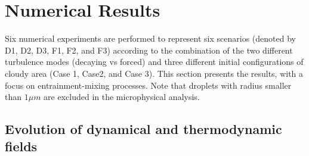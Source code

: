 \documentclass[draft,linenumbers]{agujournal}
\begin{document}
\section{Numerical Results}\label{numerical_results}
Six numerical experiments are performed to represent six scenarios (denoted by D1, D2, D3, F1, F2, and F3) according to the combination of the two different turbulence modes (decaying vs forced) and three different initial configurations of cloudy area (Case 1, Case2, and Case 3). This section presents the results, with a focus on entrainment-mixing processes. Note that droplets with radius smaller than $1\mu m$ are excluded in the microphysical analysis. 

\subsection{Evolution of dynamical and thermodynamic fields}
\end{document}
